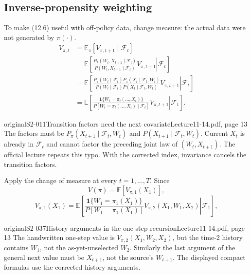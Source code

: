 \subsection{Inverse-propensity weighting}
To make (12.6) useful with off-policy data, change measure: the actual data were not generated by $\pi(\cdot)$.
\begin{align*}
 V_{\pi,t}
 &=\mathbb E_\pi[V_{\pi,t+1}\mid\mathcal F_t]\\
 &=\mathbb E\left[\left.
 \frac{P_\pi(W_t,X_{t+1}\mid\mathcal F_t)}
 {P(W_t,X_{t+1}\mid\mathcal F_t)}V_{\pi,t+1}
 \right|\mathcal F_t\right]\\
 &=\mathbb E\left[\left.
 \frac{P_\pi(W_t\mid\mathcal F_t)P_\pi(X_t\mid\mathcal F_t,W_t)}
 {P(W_t\mid\mathcal F_t)P(X_t\mid\mathcal F_t,W_t)}
 V_{\pi,t+1}\right|\mathcal F_t\right]\\
 &=\mathbb E\left[\left.
 \frac{\mathbf1\{W_t=\pi_t(\ldots,X_t)\}}
 {P[W_t=\pi_t(\ldots,X_t)\mid\mathcal F_t]}
 V_{\pi,t+1}\right|\mathcal F_t\right].
\end{align*}

\begin{reviewnote}{original}{S2-011}{Transition factors need the next covariate}{Lecture11-14.pdf, page 13}
The factors must be $P_\pi(X_{t+1}\mid\mathcal F_t,W_t)$ and $P(X_{t+1}\mid\mathcal F_t,W_t)$. Current $X_t$ is already in $\mathcal F_t$ and cannot factor the preceding joint law of $(W_t,X_{t+1})$. The official lecture repeats this typo. With the corrected index, invariance cancels the transition factors.
\end{reviewnote}


Apply the change of measure at every $t=1,\ldots,T$. Since
\[
 V(\pi)=\mathbb E[V_{\pi,1}(X_1)],
\]
\[
 V_{\pi,1}(X_1)=\mathbb E\left[\left.
 \frac{\mathbf1\{W_1=\pi_1(X_1)\}}
 {P[W_1=\pi_1(X_1)]}
 V_{\pi,2}(X_1,W_1,X_2)\right|\mathcal F_1\right],
\]
\begin{reviewnote}{original}{S2-037}{History arguments in the one-step recursion}{Lecture11-14.pdf, page 13}
The handwritten one-step value is $V_{\pi,2}(X_1,W_2,X_2)$, but the time-2 history contains $W_1$, not the as-yet-unselected $W_2$. Similarly the last argument of the general next value must be $X_{t+1}$, not the source's $W_{t+1}$. The displayed compact formulas use the corrected history arguments.
\end{reviewnote}


